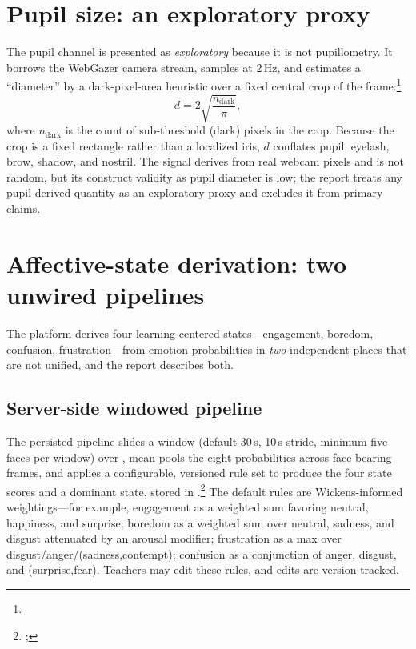 \section{Pupil size: an exploratory proxy}
\label{sec:sensing-pupil}

The pupil channel is presented as \emph{exploratory} because it is not
pupillometry. It borrows the WebGazer camera stream, samples at 2\,Hz, and
estimates a ``diameter'' by a dark-pixel-area heuristic over a fixed
central crop of the
frame:\footnote{}
\begin{equation}
  d = 2\sqrt{\dfrac{n_{\text{dark}}}{\pi}},
\end{equation}
where $n_{\text{dark}}$ is the count of sub-threshold (dark) pixels in the
crop. Because the crop is a fixed rectangle rather than a localized iris,
$d$ conflates pupil, eyelash, brow, shadow, and nostril. The signal
derives from real webcam pixels and is not random, but its construct
validity as pupil diameter is low; the report treats any pupil-derived
quantity as an exploratory proxy and excludes it from primary claims.

\section{Affective-state derivation: two unwired pipelines}
\label{sec:sensing-affect}

The platform derives four learning-centered states---engagement, boredom,
confusion, frustration---from emotion probabilities in \emph{two}
independent places that are not unified, and the report describes both.

\subsection{Server-side windowed pipeline}
The persisted pipeline slides a window (default 30\,s, 10\,s stride,
minimum five faces per window) over ,
mean-pools the eight probabilities across face-bearing frames, and applies
a configurable, versioned rule set to produce the four state scores and a
dominant state, stored in
.\footnote{;
} The default rules are
Wickens-informed weightings---for example, engagement as a weighted sum
favoring neutral, happiness, and surprise; boredom as a weighted sum over
neutral, sadness, and disgust attenuated by an arousal modifier;
frustration as a max over disgust/anger/(sadness,contempt); confusion as a
conjunction of anger, disgust, and (surprise,fear). Teachers may edit
these rules, and edits are version-tracked.

